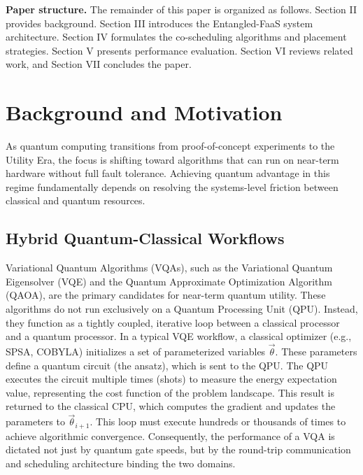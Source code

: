 \documentclass[conference]{IEEEtran}
\begin{document}
\textbf{Paper structure.} The remainder of this paper is organized as follows. Section II provides background. Section III introduces the Entangled-FaaS system architecture. Section IV formulates the co-scheduling algorithms and placement strategies. Section V presents performance evaluation. Section VI reviews related work, and Section VII concludes the paper.



\section{Background and Motivation}
\label{sec:background}

As quantum computing transitions from proof-of-concept experiments to the Utility Era, the focus is shifting toward algorithms that can run on near-term hardware without full fault tolerance. Achieving quantum advantage in this regime fundamentally depends on resolving the systems-level friction between classical and quantum resources.

\subsection{Hybrid Quantum-Classical Workflows}
Variational Quantum Algorithms (VQAs), such as the Variational Quantum Eigensolver (VQE) and the Quantum Approximate Optimization Algorithm (QAOA), are the primary candidates for near-term quantum utility. These algorithms do not run exclusively on a Quantum Processing Unit (QPU). Instead, they function as a tightly coupled, iterative loop between a classical processor and a quantum processor.
In a typical VQE workflow, a classical optimizer (e.g., SPSA, COBYLA) initializes a set of parameterized variables $\vec{\theta}$. These parameters define a quantum circuit (the ansatz), which is sent to the QPU. The QPU executes the circuit multiple times (shots) to measure the energy expectation value, representing the cost function of the problem landscape. This result is returned to the classical CPU, which computes the gradient and updates the parameters to $\vec{\theta}_{i+1}$. This loop must execute hundreds or thousands of times to achieve algorithmic convergence. Consequently, the performance of a VQA is dictated not just by quantum gate speeds, but by the round-trip communication and scheduling architecture binding the two domains.
\end{document}
